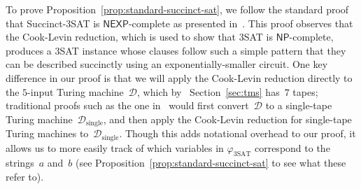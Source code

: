 \documentclass[11pt]{article}
\theoremstyle{definition}
\newcommand{\decider}{\mathcal{D}}
\begin{document}
To prove Proposition~\ref{prop:standard-succinct-sat}, we follow the standard
proof that Succinct-3SAT is $\mathsf{NEXP}$-complete as presented
in~\cite{Pap94}.
This proof observes that the Cook-Levin reduction, which is used to show that
3SAT is $\mathsf{NP}$-complete, produces a 3SAT instance whose clauses follow
such a simple pattern that they can be described succinctly using an
exponentially-smaller circuit.
One key difference in our proof is that we will apply the Cook-Levin reduction
directly to the $5$-input Turing machine~$\decider$, which by \
Section~\ref{sec:tms} has~$7$ tapes; traditional proofs such as the one
in~\cite{Pap94} would first convert~$\decider$ to a single-tape Turing
machine~$\decider_{\mathrm{single}}$, and then apply the Cook-Levin reduction
for single-tape Turing machines to~$\decider_{\mathrm{single}}$.
Though this adds notational overhead to our proof, it allows us to more easily
track of which variables in $\varphi_{\mathrm{3SAT}}$ correspond to the
strings~$a$ and~$b$ (see Proposition~\ref{prop:standard-succinct-sat} to see
what these refer to).
\end{document}
